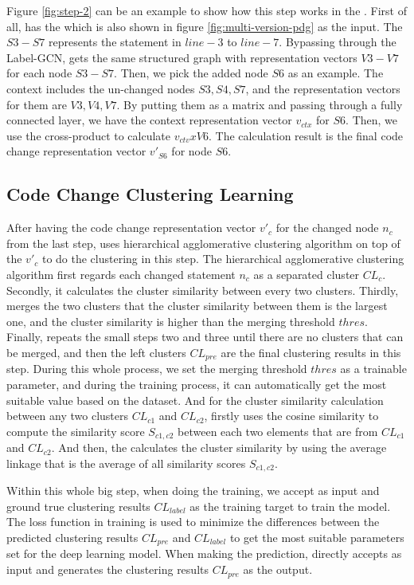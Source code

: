 Figure \ref{fig:step-2} can be an example to show how this step works in the \tool. First of all, \tool has the {\mvpdg} which is also shown in figure \ref{fig:multi-version-pdg} as the input. The $S3-S7$ represents the statement in $line-3$ to $line-7$. Bypassing through the Label-GCN, \tool gets the same structured graph with representation vectors $V3-V7$ for each node $S3-S7$. Then, we pick the added node $S6$ as an example. The context includes the un-changed nodes $S3, S4, S7$, and the representation vectors for them are $V3, V4, V7$. By putting them as a matrix and passing through a fully connected layer, we have the context representation vector $v_{ctx}$ for $S6$. Then, we use the cross-product to calculate $v_{ctv} x V6$. The calculation result is the final code change representation vector $v'_{S6}$ for node $S6$.  

\subsection{Code Change Clustering Learning}

After having the code change representation vector $v'_c$ for the changed node $n_c$ from the last step, \tool uses hierarchical agglomerative clustering algorithm on top of the $v'_c$ to do the clustering in this step. The hierarchical agglomerative clustering algorithm first regards each changed statement $n_c$ as a separated cluster $CL_c$. Secondly, it calculates the cluster similarity between every two clusters. Thirdly, \tool merges the two clusters that the cluster similarity between them is the largest one, and the cluster similarity is higher than the merging threshold $thres$. Finally, \tool repeats the small steps two and three until there are no clusters that can be merged, and then the left clusters $CL_{pre}$ are the final clustering results in this step. During this whole process, we set the merging threshold $thres$ as a trainable parameter, and during the training process, it can automatically get the most suitable value based on the dataset. And for the cluster similarity calculation between any two clusters $CL_{c1}$ and $CL_{c2}$, \tool firstly uses the cosine similarity to compute the similarity score $S_{c1,c2}$ between each two elements that are from $CL_{c1}$ and $CL_{c2}$. And then, the \tool calculates the cluster similarity by using the average linkage that is the average of all similarity scores $S_{c1,c2}$.

Within this whole big step, when doing the training, we accept {\mvpdg} as input and ground true clustering results $CL_{label}$ as the training target to train the model. The loss function in training is used to minimize the differences between the predicted clustering results $CL_{pre}$ and $CL_{label}$ to get the most suitable parameters set for the deep learning model. When making the prediction, \tool directly accepts {\mvpdg} as input and generates the clustering results $CL_{pre}$ as the output.
